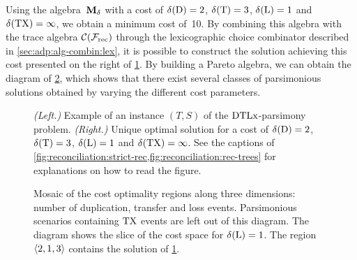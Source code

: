 Using the algebra~\(\mathbf{M}_\delta\kern.1pt\) with a cost of \(\delta\kern.1pt(\mathrm{D}) = 2\), \(\delta\kern.1pt(\mathrm{T}) = 3\), \(\delta\kern.1pt(\mathrm{L}) = 1\) and \(\delta\kern.1pt(\mathrm{TX}) = \infty\), we obtain a minimum cost of~10.
By combining this algebra with the trace algebra \(\mathcal{C}(\mathcal{F}_{\mathrm{rec}})\) through the lexicographic choice combinator described in \cref{sec:adp:alg-combin:lex}, it is possible to construct the solution achieving this cost presented on the right of \cref{fig:adp-rec:rec-input}.
By building a Pareto algebra, we can obtain the diagram of \cref{fig:adp-rec:rec-pareto}, which shows that there exist several classes of parsimonious solutions obtained by varying the different cost parameters.

\begin{figure}[p]
    \capstart
    \centering
    
    \caption[Instance of and solution to a \(\recmodelDTLx\)-parsimony problem]{
        \emph{(Left.)} Example of an instance \((T, S)\) of the \(\recmodelDTLx\)-parsimony problem.
        \emph{(Right.)} Unique optimal solution for a cost of \(\delta\kern.1pt(\mathrm{D}) = 2\), \(\delta\kern.1pt(\mathrm{T}) = 3\), \(\delta\kern.1pt(\mathrm{L}) = 1\) and \(\delta\kern.1pt(\mathrm{TX}) = \infty\).
        See the captions of \cref{fig:reconciliation:strict-rec,fig:reconciliation:rec-trees} for explanations on how to read the figure.
        \label{fig:adp-rec:rec-input}
    }
\end{figure}

\begin{table}[p]
    \capstart
    \centering
    \scalebox{.95}{}
    \caption[Event occurrence probabilities in an average scenario]{
        Event occurrence probabilities in an average scenario of the Boltzmann distribution with temperature \(T=1\) for the input and costs of \cref{fig:adp-rec:rec-input}.
        The table gives the probability that each node of \(T\) is assigned a given event type among \(\evtS\), \(\evtD\) or \(\evtT\) and is associated with a given host of the tree~\(S\).
        \label{fig:adp-rec:rec-supports}
    }
\end{table}

\begin{figure}[htbp]
    \capstart
    \centering
    
    \caption[Mosaic of cost regions for a \(\recmodelDTLx\)-parsimony instance]{
        Mosaic of the cost optimality regions along three dimensions: number of duplication, transfer and loss events.
        Parsimonious scenarios containing \(\mathrm{TX}\) events are left out of this diagram.
        The diagram shows the slice of the cost space for \(\delta\kern.1pt(\mathrm{L}) = 1\).
        The region \(\left\langle2, 1, 3\right\rangle\) contains the solution of \cref{fig:adp-rec:rec-input}.
        \label{fig:adp-rec:rec-pareto}
    }
\end{figure}

